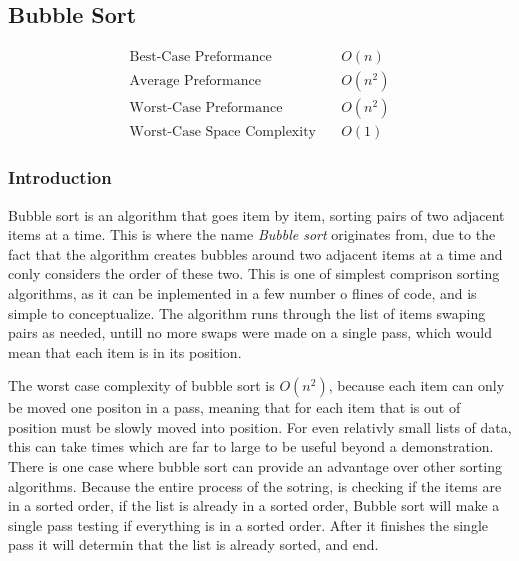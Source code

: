 \documentclass{subfile}
\begin{document}
   \subsection{Bubble Sort}
   \label{sub:bubble_sort}
   
   \begin{align*}
     \text{Best-Case Preformance}\quad &O\left(n\right)\\
     \text{Average Preformance}\quad &O\left(n^2\right)\\
     \text{Worst-Case Preformance}\quad &O\left(n^2\right)\\
     \text{Worst-Case Space Complexity}\quad &O\left(1\right)
   \end{align*}

   \begin{multicols}{2}
     \subsubsection{Introduction}
     \label{ssub:introduction}
     
     Bubble sort is an algorithm that goes item by item, sorting pairs of two
     adjacent items at a time. This is where the name \textit{Bubble sort}
     originates from, due to the fact that the algorithm creates bubbles around
     two adjacent items at a time and conly considers the order of these two.
     This is one of simplest comprison sorting algorithms, as it can be
     inplemented in a few number o flines of code, and is simple to
     conceptualize. The algorithm runs through the list of items swaping pairs
     as needed, untill no more swaps were made on a single pass, which would
     mean that each item is in its position.

     The worst case complexity of bubble sort is $O(n^2)$, because each item
     can only be moved one positon in a pass, meaning that for each item
     that is out of position must be slowly moved into position. For even
     relativly small lists of data, this can take times which are far to large
     to be useful beyond a demonstration. There is one case where bubble sort
     can provide an advantage over other sorting algorithms. Because the entire
     process of the sotring, is checking if the items are in a sorted order,
     if the list is already in a sorted order, Bubble sort will make a single
     pass testing if everything is in a sorted order. After it finishes the
     single pass it will determin that the list is already sorted, and end.


\end{multicols}
\end{document}
